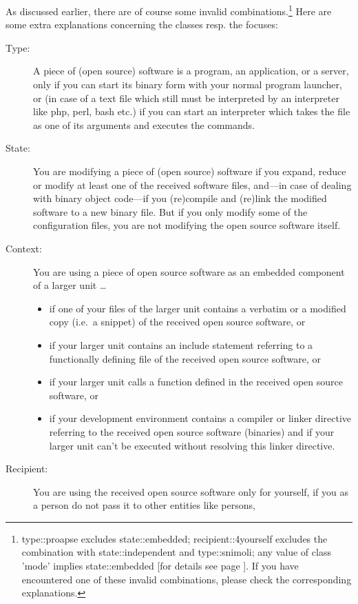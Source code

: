 As discussed earlier, there are of course some invalid
combinations.\footnote{type::proapse excludes state::embedded;
recipient::4yourself excludes the combination with state::independent and
type::snimoli; any value of class 'mode' implies state::embedded [for details
see page \pageref{InvalidFinderTokenCombinations}]. If you have encountered one of
these invalid combinations, please check the corresponding explanations.} Here
are some extra explanations concerning the classes resp. the focuses:

\begin{description}
\item[Type:] A piece of (open source) software is a program, an application, or
a server, only if you can start its binary form with your normal program
launcher, or (in case of a text file which still must be interpreted by an
interpreter like php, perl, bash etc.) if you can start an interpreter which
takes the file as one of its arguments and executes the commands.
\item[State:] You are modifying a piece of (open source) software if you expand,
reduce or modify at least one of the received software files, and---in case of
dealing with binary object code---if you (re)compile and (re)link the modified
software to a new binary file. But if you only modify some of the configuration
files, you are not modifying the open source software itself.
\item[Context:] You are using a piece of open source software as an embedded
component of a larger unit \ldots
  \begin{itemize}
  \item  if one of your files of the larger unit contains a verbatim or a
  modified copy (i.e.\ a snippet) of the received open source software, or
  \item if your larger unit contains an include statement referring to a
  functionally defining file of the received open source software, or
  \item if your larger unit calls a function defined in the received open source
  software, or
  \item if your development environment contains a compiler or linker directive
  referring to the received open source software (binaries) and if your larger
  unit can't be executed without resolving this linker directive.
  \end{itemize}
\item[Recipient:] You are using the received open source software only for
yourself, if you as a person do not pass it to other entities like persons,

\end{description}
